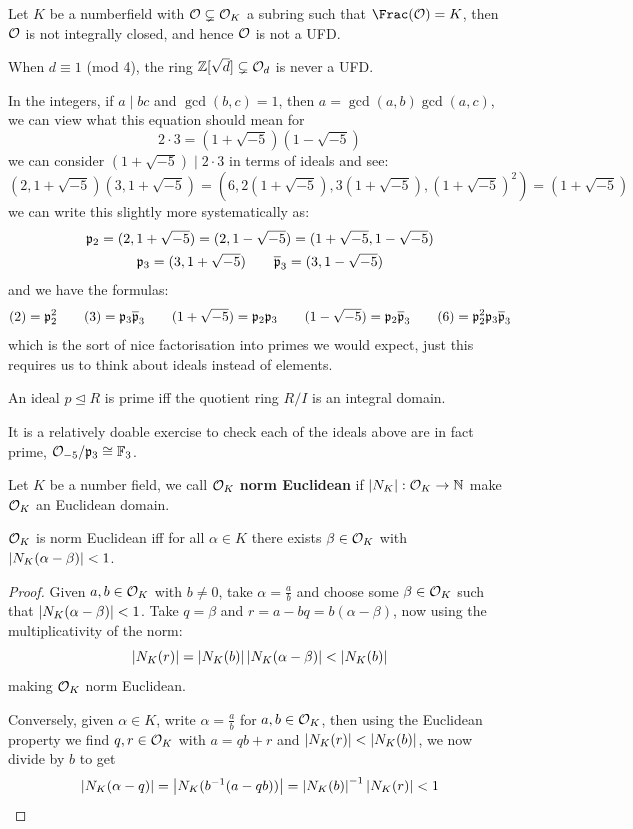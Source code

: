 \documentclass{article}
\begin{document}
\begin{corollary}
    Let $K$ be a numberfield with $\mathcal{O}\subsetneq \mathcal{O}_K$ a subring such that $\Frac(\cO)=K$, then $\mathcal{O}$ is not integrally closed, and hence $\mathcal{O}$ is not a UFD.
\end{corollary}

When $d\equiv 1$ (mod 4), the ring $\mathbb{Z}[\sqrt{d}]\subsetneq\mathcal{O}_d$ is never a UFD.

In the integers, if $a\mid bc$ and $\gcd(b,c)=1$, then $a=\gcd(a,b)\gcd(a,c)$, we can view what this equation should mean for \[
2\cdot 3 = (1+\sqrt{-5})(1-\sqrt{-5})
\] we can consider $(1+\sqrt{-5})\mid2\cdot 3$ in terms of ideals and see: \[
(2,1+\sqrt{-5})(3,1+\sqrt{-5}) = (6,2(1+\sqrt{-5}),3(1+\sqrt{-5}),(1+\sqrt{-5})^2)=(1+\sqrt{-5})
\] we can write this slightly more systematically as: \begin{gather*}
    \mathfrak{p}_2 = (2,1+\sqrt{-5}) = (2,1-\sqrt{-5}) = (1+\sqrt{-5},1-\sqrt{-5}) \\
    \mathfrak{p}_3 = (3,1+\sqrt{-5}) \qquad \overline{\mathfrak{p}}_3 = (3,1-\sqrt{-5})
\end{gather*} and we have the formulas: \[
(2) = \mathfrak{p}_2^2 \qquad (3) = \mathfrak{p}_3\overline{\mathfrak{p}}_3 \qquad (1+\sqrt{-5}) = \mathfrak{p}_2\mathfrak{p}_3 \qquad (1-\sqrt{-5})=\mathfrak{p}_2\overline{\mathfrak{p}}_3 \qquad (6) = \mathfrak{p}_2^2\mathfrak{p}_3\overline{\mathfrak{p}}_3
\] which is the sort of nice factorisation into primes we would expect, just this requires us to think about ideals instead of elements.

\begin{proposition}
    An ideal $p\unlhd R$ is prime iff the quotient ring $R/I$ is an integral domain.
\end{proposition}

It is a relatively doable exercise to check each of the ideals above are in fact prime, $\mathcal{O}_{-5}/\mathfrak{p}_3\cong\mathbb{F}_3$.

\begin{definition}
    Let $K$ be a number field, we call $\mathcal{O}_K$ \textbf{norm Euclidean} if $\left| N_K \right|:\mathcal{O}_K\rightarrow\mathbb{N}$ make $\mathcal{O}_K$ an Euclidean domain.
\end{definition}

\begin{lemma}
    $\mathcal{O}_K$ is norm Euclidean iff for all $\alpha\in K$ there exists $\beta\in \mathcal{O}_K$ with $\left| N_K(\alpha-\beta) \right|<1$.
    \begin{proof}
        Given $a,b\in\mathcal{O}_K$ with $b\neq 0$, take $\alpha=\frac{a}{b}$ and choose some $\beta\in\mathcal{O}_K$ such that $\left| N_K(\alpha-\beta) \right|<1$. Take $q=\beta$ and $r=a-bq=b(\alpha-\beta)$, now using the multiplicativity of the norm: \[
        \left| N_K(r) \right| = \left| N_K(b) \right|\left| N_K(\alpha-\beta) \right| < \left| N_K(b) \right|
        \] making $\mathcal{O}_K$ norm Euclidean.

        Conversely, given $\alpha\in K$, write $\alpha=\frac{a}{b}$ for $a,b\in\mathcal{O}_K$, then using the Euclidean property we find $q,r\in\mathcal{O}_K$ with $a=qb+r$ and $\left| N_K(r) \right|<\left| N_K(b) \right|$, we now divide by $b$ to get \[
        \left| N_K(\alpha-q) \right| = \left| N_K(b^{-1}(a-qb)) \right| = \left| N_K(b) \right|^{-1}\left| N_K(r) \right|<1\qedhere
        \]
    \end{proof}
\end{lemma}
\end{document}
